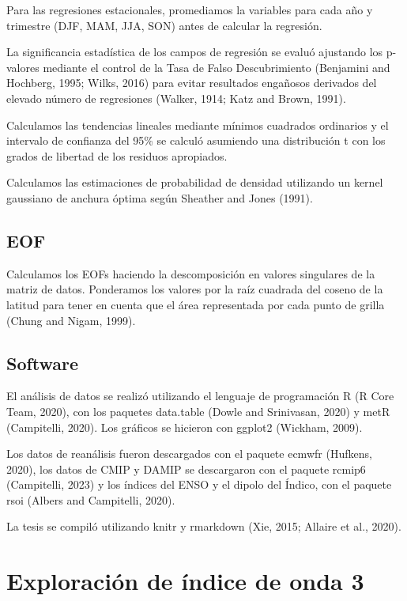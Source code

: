 \documentclass[12pt,oneside]{reedthesis}
\begin{document}
Para las regresiones estacionales, promediamos la variables para cada año y trimestre (DJF, MAM, JJA, SON) antes de calcular la regresión.

La significancia estadística de los campos de regresión se evaluó ajustando los p-valores mediante el control de la Tasa de Falso Descubrimiento (Benjamini and Hochberg, 1995; Wilks, 2016) para evitar resultados engañosos derivados del elevado número de regresiones (Walker, 1914; Katz and Brown, 1991).

Calculamos las tendencias lineales mediante mínimos cuadrados ordinarios y el intervalo de confianza del 95\% se calculó asumiendo una distribución t con los grados de libertad de los residuos apropiados.

Calculamos las estimaciones de probabilidad de densidad utilizando un kernel gaussiano de anchura óptima según Sheather and Jones (1991).

\hypertarget{eof}{%
\section{EOF}\label{eof}}

Calculamos los EOFs haciendo la descomposición en valores singulares de la matriz de datos.
Ponderamos los valores por la raíz cuadrada del coseno de la latitud para tener en cuenta que el área representada por cada punto de grilla (Chung and Nigam, 1999).

\hypertarget{software}{%
\section{Software}\label{software}}

El análisis de datos se realizó utilizando el lenguaje de programación R (R Core Team, 2020), con los paquetes data.table (Dowle and Srinivasan, 2020) y metR (Campitelli, 2020).
Los gráficos se hicieron con ggplot2 (Wickham, 2009).

Los datos de reanálisis fueron descargados con el paquete ecmwfr (Hufkens, 2020), los datos de CMIP y DAMIP se descargaron con el paquete rcmip6 (Campitelli, 2023) y los índices del ENSO y el dipolo del Índico, con el paquete rsoi (Albers and Campitelli, 2020).

La tesis se compiló utilizando knitr y rmarkdown (Xie, 2015; Allaire et al., 2020).

\hypertarget{exploraciuxf3n-de-uxedndice-de-onda-3}{%
\chapter{Exploración de índice de onda 3}\label{exploraciuxf3n-de-uxedndice-de-onda-3}}
\end{document}
